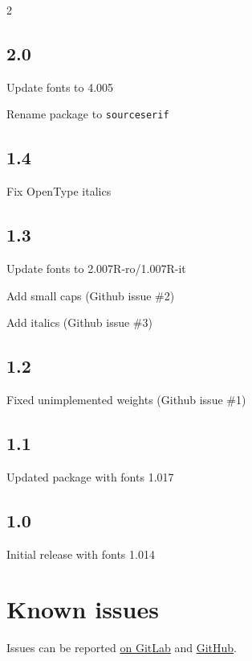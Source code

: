 \documentclass[10pt,a4paper,english]{article}
\begin{document}
\begin{multicols}{2}
\subsection*{2.0}
\begin{itemize*}
	\item Update fonts to 4.005
	\item Rename package to \texttt{sourceserif}
\end{itemize*}

\subsection*{1.4}
\begin{itemize*}
	\item Fix OpenType italics
\end{itemize*}

\subsection*{1.3}
\begin{itemize*}
	\item Update fonts to 2.007R-ro/1.007R-it
	\item Add small caps (Github issue \#2)
	\item Add italics (Github issue \#3)
\end{itemize*}

\subsection*{1.2}
\begin{itemize*}
	\item Fixed unimplemented weights (Github issue \#1)
\end{itemize*}

\subsection*{1.1}
\begin{itemize*}
	\item Updated package with fonts 1.017
\end{itemize*}

\subsection*{1.0}
\begin{itemize*}
	\item Initial release with fonts 1.014
\end{itemize*}

\section{Known issues}

Issues can be reported \href{https://gitlab.com/slxh/latex/sourceserif/issues}{on GitLab} and \href{https://github.com/silkeh/latex-sourceserifpro/issues}{GitHub}.

\newpage
\end{multicols}
\end{document}
